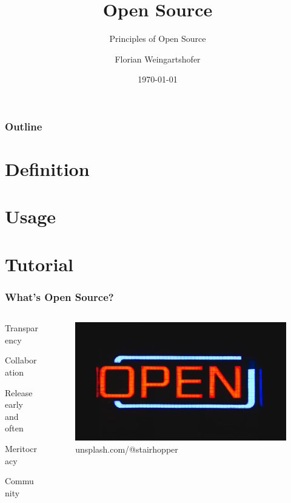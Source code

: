 \documentclass{beamer}
\title{Open Source}
\subtitle{Principles of Open Source}
\author{Florian Weingartshofer}
\institute{FH Hagenberg}
\date{\today}
\begin{document}
\titlepage

\begin{frame}
  \frametitle{Outline}
  \tableofcontents
\end{frame}

\section{Definition}
\section{Usage}
\section{Tutorial}

\begin{frame}
  \frametitle{What's Open Source?}
  \begin{columns}
    \begin{column}{0.5\textwidth}
      \begin{center}
        \Large
        Transparency

        Collaboration

        Release early and often

        Meritocracy

        Community
      \end{center}
    \end{column}
    \begin{column}{0.5\textwidth}  %
      \begin{center}
        \begin{figure}
          \includegraphics[scale=0.03]{./img/open.jpg}
          \caption{unsplash.com/@stairhopper}
        \end{figure}
      \end{center}
    \end{column}
  \end{columns}
\end{frame}
\end{document}
